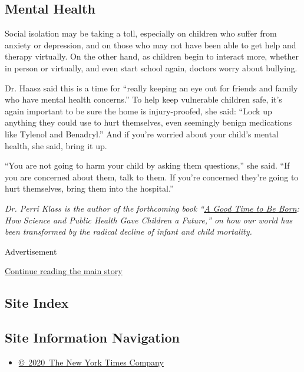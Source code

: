 \hypertarget{mental-health}{%
\subsection{Mental Health}\label{mental-health}}

Social isolation may be taking a toll, especially on children who suffer
from anxiety or depression, and on those who may not have been able to
get help and therapy virtually. On the other hand, as children begin to
interact more, whether in person or virtually, and even start school
again, doctors worry about bullying.

Dr. Haasz said this is a time for ``really keeping an eye out for
friends and family who have mental health concerns.'' To help keep
vulnerable children safe, it's again important to be sure the home is
injury-proofed, she said: ``Lock up anything they could use to hurt
themselves, even seemingly benign medications like Tylenol and
Benadryl.'' And if you're worried about your child's mental health, she
said, bring it up.

``You are not going to harm your child by asking them questions,'' she
said. ``If you are concerned about them, talk to them. If you're
concerned they're going to hurt themselves, bring them into the
hospital.''

\emph{Dr. Perri Klass is the author of the forthcoming book
``}\href{https://www.amazon.com/Good-Time-Be-Born-Children/dp/0393609995/ref=tmm_hrd_swatch_0?_encoding=UTF8\&qid=\&sr=}{\emph{A
Good Time to Be Born}}\emph{: How Science and Public Health Gave
Children a Future,'' on how our world has been transformed by the
radical decline of infant and child mortality.}

Advertisement

\protect\hyperlink{after-bottom}{Continue reading the main story}

\hypertarget{site-index}{%
\subsection{Site Index}\label{site-index}}

\hypertarget{site-information-navigation}{%
\subsection{Site Information
Navigation}\label{site-information-navigation}}

\begin{itemize}
\tightlist
\item
  \href{https://help.nytimes.com/hc/en-us/articles/115014792127-Copyright-notice}{©~2020~The
  New York Times Company}
\end{itemize}

